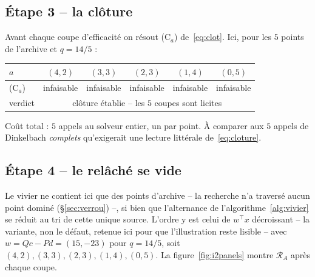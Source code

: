 \documentclass[11pt,a4paper]{article}
\theoremstyle{plain}
\theoremstyle{remark}
\newcommand{\Rcal}{\mathcal{R}}
\begin{document}
\subsection{Étape 3 -- la clôture}

Avant chaque coupe d'efficacité on résout (C$_a$) de~\eqref{eq:clot}. Ici,
pour les $5$ points de l'archive et $q=14/5$ :
\begin{center}
\begin{tabular}{lccccc}
\toprule
$a$ & $(4,2)$ & $(3,3)$ & $(2,3)$ & $(1,4)$ & $(0,5)$\\
\midrule
(C$_a$) & infaisable & infaisable & infaisable & infaisable & infaisable\\
verdict & \multicolumn{5}{c}{clôture établie -- les $5$ coupes sont licites}\\
\bottomrule
\end{tabular}
\end{center}
\noindent
Coût total : $5$ appels au solveur entier, un par point. À comparer aux $5$
appels de Dinkelbach \emph{complets} qu'exigerait une lecture littérale
de~\eqref{eq:cloture}.

\subsection{Étape 4 -- le relâché se vide}

Le vivier ne contient ici que des points d'archive -- la recherche n'a
traversé aucun point dominé (§\ref{sec:verrou}) --, si bien que l'alternance
de l'algorithme~\ref{alg:vivier} se réduit au tri de cette unique source.
L'ordre y est celui de $w^{\top}x$ décroissant -- la variante, non le
défaut, retenue ici pour que l'illustration reste lisible -- avec
$w=Qc-Pd=(15,-23)$ pour
$q=14/5$, soit $(4,2),(3,3),(2,3),(1,4),(0,5)$. La
figure~\ref{fig:i2panels} montre $\Rcal_A$ après chaque coupe.

\newcommand{\panel}[2]{%
\begin{tikzpicture}[scale=0.46,font=\tiny]
  \draw[cgris!50,very thin] (-0.45,-0.45) rectangle (4.55,5.55);
  \foreach \p in {(0,0),(0,1),(0,2),(0,3),(0,4),(0,5),(1,0),(1,1),(1,2),(1,3),
                  (1,4),(2,0),(2,1),(2,2),(2,3),(3,0),(3,1),(3,2),(3,3),
                  (4,0),(4,1),(4,2)}
    {\draw[cgris] \p circle (2.0pt);}
  \foreach \p in {#2} \fill[ceff] \p circle (3.4pt);
  \node[below=2pt,font=\scriptsize,align=center] at (2.05,-0.75) {#1};
\end{tikzpicture}}
\end{document}
